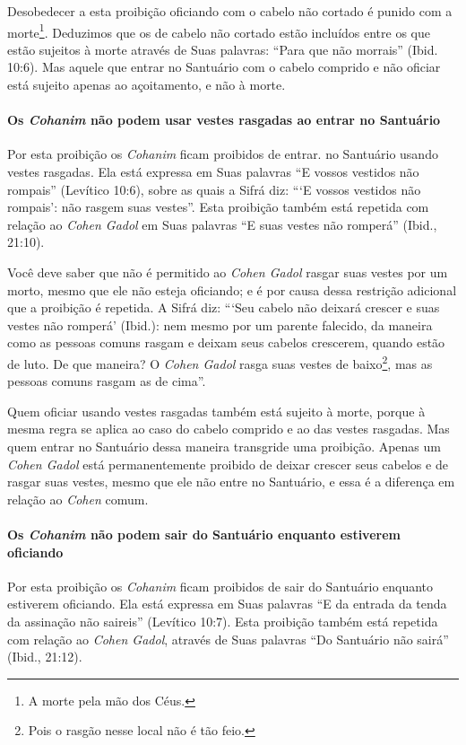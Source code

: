 Desobedecer a esta proibição oficiando com o cabelo não cortado é punido
com a morte\footnote{A morte pela mão dos Céus.}. Deduzimos que os de cabelo não
cortado estão incluídos entre os que estão sujeitos à morte através de
Suas palavras: ``Para que não morrais'' (Ibid. 10:6). Mas aquele que
entrar no Santuário com o cabelo comprido e não oficiar está sujeito
apenas ao açoitamento, e não à morte.

\paragraph{Os \textit{Cohanim} não podem usar vestes rasgadas ao entrar no Santuário}

Por esta proibição os \textit{Cohanim} ficam proibidos de entrar. no
Santuário usando vestes rasgadas. Ela está expressa em Suas palavras ``E
vossos vestidos não rompais'' (Levítico 10:6), sobre as quais a Sifrá
diz: ```E vossos vestidos não rompais': não rasgem suas vestes''. Esta
proibição também está repetida com relação ao \textit{Cohen Gadol} em Suas
palavras ``E suas vestes não romperá'' (Ibid., 21:10).

Você deve saber que não é permitido ao \textit{Cohen Gadol} rasgar suas
vestes por um morto, mesmo que ele não esteja oficiando; e é por causa
dessa restrição adicional que a proibição é repetida. A Sifrá diz:
```Seu cabelo não deixará crescer e suas vestes não romperá' (Ibid.): nem mesmo por um
parente falecido, da maneira como as pessoas comuns rasgam e deixam seus
cabelos crescerem, quando estão de luto. De que maneira? O \textit{Cohen
Gadol} rasga suas vestes de baixo\footnote{Pois o rasgão nesse local não é tão feio.}, mas as pessoas
comuns rasgam as de cima''.

Quem oficiar usando vestes rasgadas também está sujeito à morte, porque
à mesma regra se aplica ao caso do cabelo comprido e ao das vestes
rasgadas. Mas quem entrar no Santuário dessa maneira transgride uma
proibição. Apenas um \textit{Cohen Gadol} está permanentemente proibido de
deixar crescer seus cabelos e de rasgar suas vestes, mesmo que ele não
entre no Santuário, e essa é a diferença em relação ao \textit{Cohen} comum.

\paragraph{Os \textit{Cohanim} não podem sair do Santuário enquanto estiverem oficiando}

Por esta proibição os \textit{Cohanim} ficam proibidos de sair do Santuário
enquanto estiverem oficiando. Ela está expressa em Suas palavras ``E da
entrada da tenda da assinação não saireis'' (Levítico 10:7). Esta
proibição também está repetida com relação ao \textit{Cohen Gadol}, através
de Suas palavras ``Do Santuário não sairá'' (Ibid., 21:12).

